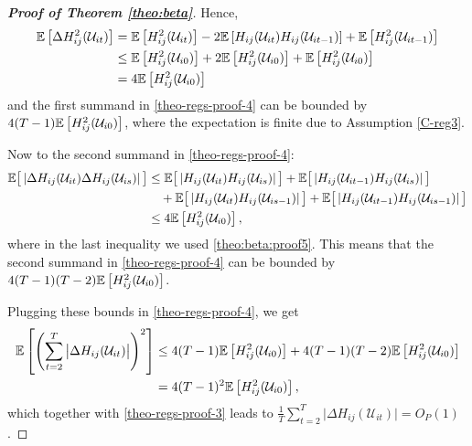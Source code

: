 \begin{proof}[\textnormal{\textbf{Proof of Theorem \ref{theo:beta}}}]
Hence, 
\begin{align*}
 \mathbb{E} \left[ \Delta  H^2_{ij} (\mathcal{U}_{it})  \right]  &=  \mathbb{E} \left[ H^2_{ij} (\mathcal{U}_{it}) \right] - 2\mathbb{E} \left[ H_{ij} (\mathcal{U}_{it}) H_{ij}(\mathcal{U}_{it-1}) \right]  + \mathbb{E} \left[ H^2_{ij}(\mathcal{U}_{it-1}) \right] \\
& \leq \mathbb{E} \left[ H^2_{ij} (\mathcal{U}_{i0}) \right] + 2\mathbb{E} \left[ H^2_{ij} (\mathcal{U}_{i0}) \right]  + \mathbb{E} \left[ H^2_{ij}(\mathcal{U}_{i0}) \right] \\
&= 4 \mathbb{E} \left[ H^2_{ij} (\mathcal{U}_{i0}) \right]
\end{align*}
and the first summand in \eqref{theo-regs-proof-4} can be bounded by $4(T - 1)\mathbb{E} \left[ H^2_{ij} (\mathcal{U}_{i0}) \right]$, where the expectation is finite due to Assumption \ref{C-reg3}.

Now to the second summand in \eqref{theo-regs-proof-4}:
\begin{align*}
\mathbb{E} \big[ \left|\Delta  H_{ij} (\mathcal{U}_{it}) \Delta  H_{ij} (\mathcal{U}_{is})\right| \big] &\leq \mathbb{E} \big[ \left| H_{ij} (\mathcal{U}_{it}) H_{ij} (\mathcal{U}_{is}) \right|\big] + \mathbb{E} \big[ \left| H_{ij} (\mathcal{U}_{it-1}) H_{ij} (\mathcal{U}_{is}) \right|\big] \\
&\quad + \mathbb{E} \big[ \left| H_{ij} (\mathcal{U}_{it}) H_{ij} (\mathcal{U}_{is-1}) \right|\big] + \mathbb{E} \big[ \left| H_{ij} (\mathcal{U}_{it-1}) H_{ij} (\mathcal{U}_{is-1}) \right|\big] \\
&\leq  4\mathbb{E} \left[ H^2_{ij}(\mathcal{U}_{i0}) \right],
\end{align*}
where in the last inequality we used \eqref{theo:beta:proof5}. This means that the second summand in \eqref{theo-regs-proof-4} can be bounded by $4(T-1)(T-2) \mathbb{E} \left[ H^2_{ij} (\mathcal{U}_{i0}) \right]$.

Plugging these bounds in \eqref{theo-regs-proof-4}, we get
\begin{align*}
\mathbb{E} \left[ \left(\sum_{t=2}^T \big|\Delta  H_{ij} (\mathcal{U}_{it})\big|\right)^2 \right] &\leq 4(T-1) \mathbb{E} \left[ H^2_{ij} (\mathcal{U}_{i0}) \right] + 4(T-1)(T-2)\mathbb{E} \left[ H^2_{ij} (\mathcal{U}_{i0}) \right] \\
&= 4 (T-1)^2 \mathbb{E} \left[ H^2_{ij} (\mathcal{U}_{i0}) \right],
\end{align*}
which together with \eqref{theo-regs-proof-3} leads to $\frac{1}{T}\sum_{t=2}^T \big|\Delta H_{ij}(\mathcal{U}_{it})\big| = O_P(1)$.


\end{proof}
